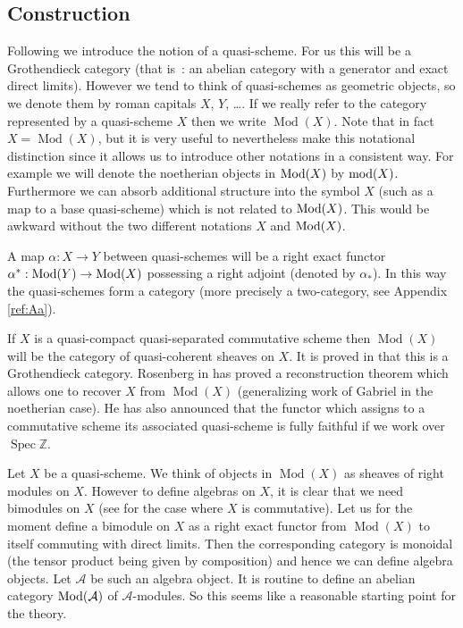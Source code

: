 \documentclass{amsproc}
\def \ZZ{{\mathbb Z}}
\def\Ascr{{\mathcal A}}
\def\Mod{\mathop{\text{Mod}}}
\def\mod{\mathop{\text{mod}}}
\def\Spec{\operatorname {Spec}}
\def\Qch{\operatorname {Mod}}
\def\r{\rightarrow}
\let\oldtext\text
\def\text#1{\oldtext{\upshape #1}}
\theoremstyle{definition}
\theoremstyle{remark}
\numberwithin{equation}{section}
\numberwithin{table}{section}
\numberwithin{figure}{section}
\begin{document}
\subsection{Construction}
Following
\cite{rosenberg} we introduce the notion of a quasi-scheme. For us
this will be a Grothendieck category (that is~: an abelian category
with a generator and exact direct limits). However we tend to think of
quasi-schemes as geometric objects, so we denote them by roman
capitals $X$, $Y$, \dots.  If we really refer to the category
represented by a quasi-scheme $X$ then we write $\Qch(X)$. Note that in
fact $X=\Qch(X)$, but it is very useful to nevertheless make this
notational distinction since it allows us to introduce other notations
in a consistent way. For example we will  denote the noetherian
objects in $\Mod(X)$ by $\mod(X)$. Furthermore we can absorb 
additional structure into the symbol $X$ (such as a map to a base
quasi-scheme) which is not related to $\Mod(X)$. This would be awkward
without the two different notations $X$ and $\Mod(X)$.

A map $\alpha:X\r Y$ between quasi-schemes will be a right exact
functor $\alpha^\ast:\Mod(Y)\r \Mod(X)$ possessing a right adjoint
(denoted by $\alpha_\ast$). In this way the quasi-schemes form a
category (more precisely a two-category, see Appendix \ref{ref:Aa}).

If $X$ is a quasi-compact quasi-separated commutative scheme then
$\Qch(X)$ will be the category of
quasi-coherent sheaves on $X$. It is proved in \cite{thomasson} that
this is a Grothendieck category.  Rosenberg in \cite{rosenberg1} has
proved a reconstruction theorem which allows one to recover $X$ from
$\Qch(X)$ (generalizing work of Gabriel in the noetherian
case). He has also announced that the  functor which assigns to a
commutative scheme its associated quasi-scheme is fully
faithful if we work over $\Spec\ZZ$.



Let $X$ be a quasi-scheme. We think of objects in $\Qch(X)$ as sheaves of right
modules on $X$. However to define algebras on $X$, it is clear that we 
need
bimodules on $X$ (see \cite{VdB11} for the case where $X$ is commutative).
Let us for the moment define a bimodule on $X$ as a right exact functor
from $\Qch(X)$ to itself commuting with direct limits. Then the
corresponding category is monoidal (the tensor product
 being given by composition) and hence we can define
algebra objects. Let $\Ascr$ be such an algebra object. It is routine to
define an abelian category $\Mod(\Ascr)$ of $\Ascr$-modules. So this
seems like a reasonable starting point for the theory.
\end{document}
